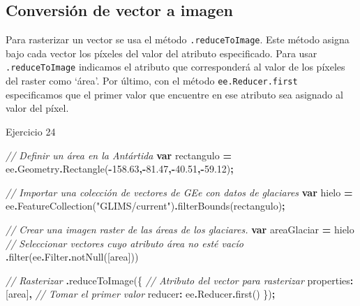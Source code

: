 \documentclass[
  12pt,
  letterpaper,
  twoside]{book}
\newenvironment{Shaded}{\begin{snugshade}}{\end{snugshade}}
\newcommand{\AttributeTok}[1]{\textcolor[rgb]{0.77,0.63,0.00}{#1}}
\newcommand{\CommentTok}[1]{\textcolor[rgb]{0.56,0.35,0.01}{\textit{#1}}}
\newcommand{\DataTypeTok}[1]{\textcolor[rgb]{0.13,0.29,0.53}{#1}}
\newcommand{\FloatTok}[1]{\textcolor[rgb]{0.00,0.00,0.81}{#1}}
\newcommand{\FunctionTok}[1]{\textcolor[rgb]{0.00,0.00,0.00}{#1}}
\newcommand{\KeywordTok}[1]{\textcolor[rgb]{0.13,0.29,0.53}{\textbf{#1}}}
\newcommand{\NormalTok}[1]{#1}
\newcommand{\OperatorTok}[1]{\textcolor[rgb]{0.81,0.36,0.00}{\textbf{#1}}}
\newcommand{\StringTok}[1]{\textcolor[rgb]{0.31,0.60,0.02}{#1}}
\begin{document}
\hypertarget{conversiuxf3n-de-vector-a-imagen}{%
\subsection*{Conversión de vector a imagen}\label{conversiuxf3n-de-vector-a-imagen}}

Para rasterizar un vector se usa el método \texttt{.reduceToImage}. Este método asigna bajo cada vector los píxeles del valor del atributo especificado. Para usar \texttt{.reduceToImage} indicamos el atributo que corresponderá al valor de los píxeles del raster como `área'. Por último, con el método \texttt{ee.Reducer.first} especificamos que el primer valor que encuentre en ese atributo sea asignado al valor del píxel.

Ejercicio 24

\begin{Shaded}
\begin{Highlighting}[]
\CommentTok{// Definir un área en la Antártida}
\KeywordTok{var}\NormalTok{ rectangulo }\OperatorTok{=}\NormalTok{ ee}\OperatorTok{.}\AttributeTok{Geometry}\OperatorTok{.}\FunctionTok{Rectangle}\NormalTok{(}\OperatorTok{{-}}\FloatTok{158.63}\OperatorTok{,{-}}\FloatTok{81.47}\OperatorTok{,{-}}\FloatTok{40.51}\OperatorTok{,{-}}\FloatTok{59.12}\NormalTok{)}\OperatorTok{;}

\CommentTok{// Importar una colección de vectores de GEe con datos de glaciares}
\KeywordTok{var}\NormalTok{ hielo }\OperatorTok{=}\NormalTok{ ee}\OperatorTok{.}\FunctionTok{FeatureCollection}\NormalTok{(}\StringTok{"GLIMS/current"}\NormalTok{)}\OperatorTok{.}\FunctionTok{filterBounds}\NormalTok{(rectangulo)}\OperatorTok{;}

\CommentTok{// Crear una imagen raster de las áreas de los glaciares.}
\KeywordTok{var}\NormalTok{ areaGlaciar }\OperatorTok{=}\NormalTok{ hielo}
\CommentTok{// Seleccionar vectores cuyo atributo área no esté vacío}
    \OperatorTok{.}\FunctionTok{filter}\NormalTok{(ee}\OperatorTok{.}\AttributeTok{Filter}\OperatorTok{.}\FunctionTok{notNull}\NormalTok{([}\StringTok{\textquotesingle{}area\textquotesingle{}}\NormalTok{])) }
    
\CommentTok{// Rasterizar  }
\OperatorTok{.}\FunctionTok{reduceToImage}\NormalTok{(\{}
    \CommentTok{// Atributo del vector para rasterizar}
    \DataTypeTok{properties}\OperatorTok{:}\NormalTok{ [}\StringTok{\textquotesingle{}area\textquotesingle{}}\NormalTok{]}\OperatorTok{,} 
    \CommentTok{// Tomar el primer valor}
    \DataTypeTok{reducer}\OperatorTok{:}\NormalTok{ ee}\OperatorTok{.}\AttributeTok{Reducer}\OperatorTok{.}\FunctionTok{first}\NormalTok{()  }
\NormalTok{    \})}\OperatorTok{;}
\end{Highlighting}
\end{Shaded}
\end{document}
